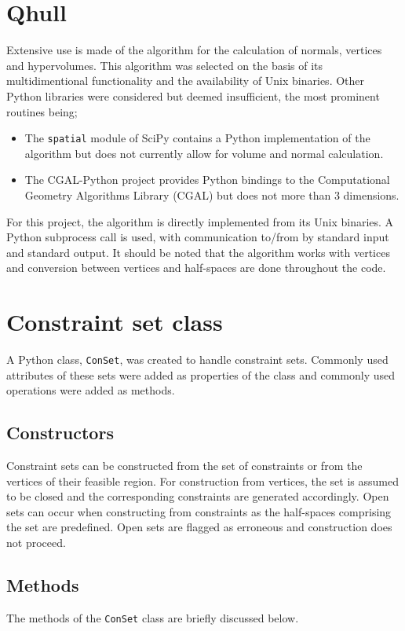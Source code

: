 \section{Qhull}\label{sec:qhull}
Extensive use is made of the \qhull algorithm \citep{qhull} for the calculation of normals, vertices and hypervolumes.
This algorithm was selected on the basis of its multidimentional functionality and the availability of Unix binaries.
Other Python libraries were considered but deemed insufficient, the most prominent routines being;
\begin{itemize}
\item The \texttt{spatial} module of SciPy contains a Python implementation of the \qhull algorithm but does not currently allow for volume and normal calculation.
\item The CGAL-Python project \citep{cgal} provides Python bindings to the Computational Geometry Algorithms Library (CGAL) but does not more than 3 dimensions.
\end{itemize}

For this project, the \qhull algorithm is directly implemented from its Unix binaries.
A Python subprocess call is used, with communication to/from \qhull by standard input and standard output.
It should be noted that the \qhull algorithm works with vertices and conversion between vertices and half-spaces are done throughout the code.

\section{Constraint set class}
\label{sec:conclass}
A Python class, \texttt{ConSet}, was created to handle constraint sets.
Commonly used attributes of these sets were added as properties of the class and commonly used operations were added as methods.

\subsection{Constructors}
Constraint sets can be constructed from the set of constraints or from the vertices of their feasible region.
For construction from vertices, the set is assumed to be closed and the corresponding constraints are generated accordingly.
Open sets can occur when constructing from constraints as the half-spaces comprising the set are predefined.
Open sets are flagged as erroneous and construction does not proceed.

\subsection{Methods}
The methods of the \texttt{ConSet} class are briefly discussed below.

